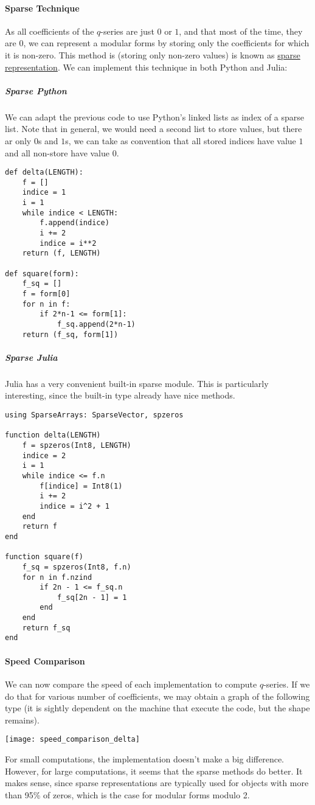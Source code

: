 \paragraph{Sparse Technique}
As all coefficients of the $q$-series are just $0$ or $1$, and that most of the time, they are $0$, we can represent a modular forms by storing only the coefficients for which it is non-zero.
This method is (storing only non-zero values) is known as \href{https://en.wikipedia.org/wiki/Sparse_matrix}{sparse representation}.
We can implement this technique in both Python and Julia:
\subparagraph{Sparse Python}
We can adapt the previous code to use Python's linked lists as index of a sparse list.
Note that in general, we would need a second list to store values, but there ar only $0$s and $1$s, we can take as convention that all stored indices have value $1$ and all non-store have value $0$. 
\begin{verbatim}
def delta(LENGTH):
	f = []
	indice = 1
	i = 1
	while indice < LENGTH:
		f.append(indice)
		i += 2
		indice = i**2
	return (f, LENGTH)

def square(form):
	f_sq = []
	f = form[0]
	for n in f:
		if 2*n-1 <= form[1]:
			f_sq.append(2*n-1)
	return (f_sq, form[1])
\end{verbatim}
\subparagraph{Sparse Julia}
Julia has a very convenient built-in sparse module.
This is particularly interesting, since the built-in type already have nice methods.
\begin{verbatim}
using SparseArrays: SparseVector, spzeros

function delta(LENGTH)
	f = spzeros(Int8, LENGTH)
	indice = 2
	i = 1
	while indice <= f.n
		f[indice] = Int8(1)
		i += 2
		indice = i^2 + 1
	end
	return f
end

function square(f)
	f_sq = spzeros(Int8, f.n)
	for n in f.nzind
		if 2n - 1 <= f_sq.n
			f_sq[2n - 1] = 1
		end
	end
	return f_sq
end
\end{verbatim}
\paragraph{Speed Comparison}
We can now compare the speed of each implementation to compute $q$-series.
If we do that for various number of coefficients, we may obtain a graph of the following type (it is sightly dependent on the machine that execute the code, but the shape remains).

\texttt{[image: speed\_comparison\_delta]}

For small computations, the implementation doesn't make a big difference.
However, for large computations, it seems that the sparse methods do better.
It makes sense, since sparse representations are typically used for objects with more than 95\% of zeros, which is the case for modular forms modulo 2.

